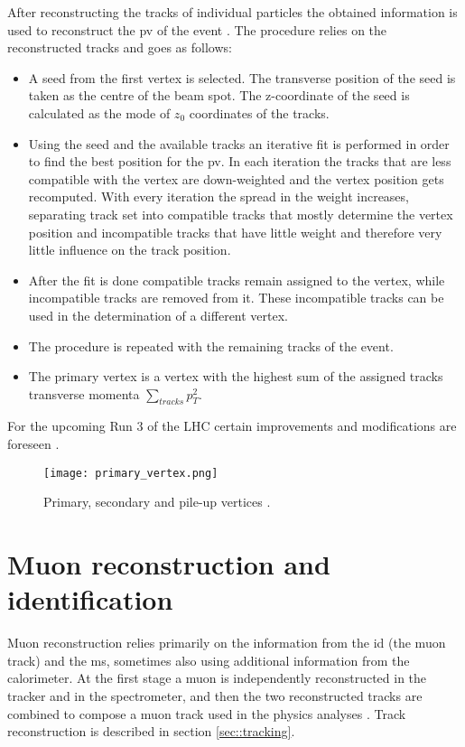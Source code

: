   After reconstructing the tracks of individual particles the obtained information is used to reconstruct the \gls{pv} of the event \cite{PrimVertRun12}. The procedure relies on the reconstructed tracks and goes as follows:
  \begin{itemize}
  \item A seed from the first vertex is selected. The transverse position of the seed is taken as the centre of the beam spot. The z-coordinate of the seed is calculated as the mode of $z_0$ coordinates of the tracks.
  \item Using the seed and the available tracks an iterative fit is performed in order to find the best position for the \gls{pv}. In each iteration the tracks that are less compatible with the vertex are down-weighted and the vertex position gets recomputed. With every iteration the spread in the weight increases, separating track set into compatible tracks that mostly determine the vertex position and incompatible tracks that have little weight and therefore very little influence on the track position. 
  \item After the fit is done compatible tracks remain assigned to the vertex, while incompatible tracks are removed from it. These incompatible tracks can be used in the determination of a different vertex.
  \item The procedure is repeated with the remaining tracks of the event. 
  \item The primary vertex is a vertex with the highest sum of the assigned tracks transverse momenta $\sum_{tracks}p_T^{2}$.
  \end{itemize}  
  For the upcoming Run 3 of the LHC certain improvements and modifications are foreseen \cite{PrimVertRun3}.
  \begin{figure}[htbp]
  	\centering
  	\texttt{[image: primary\_vertex.png]}
  	\caption[Vertices]{Primary, secondary and pile-up vertices \cite{vert_recon}.}
  	\label{fig::pv}
  \end{figure}
    \section{Muon reconstruction and identification}
    Muon reconstruction relies primarily on the information from the \gls{id} (the muon track) and the \gls{ms}, sometimes also using additional information from the calorimeter. At the first stage a muon is independently reconstructed in the tracker and in the spectrometer, and then the two reconstructed tracks are combined to compose a muon track used in the physics analyses \cite{muons_reco1}. Track reconstruction is described in section \ref{sec::tracking}. 
